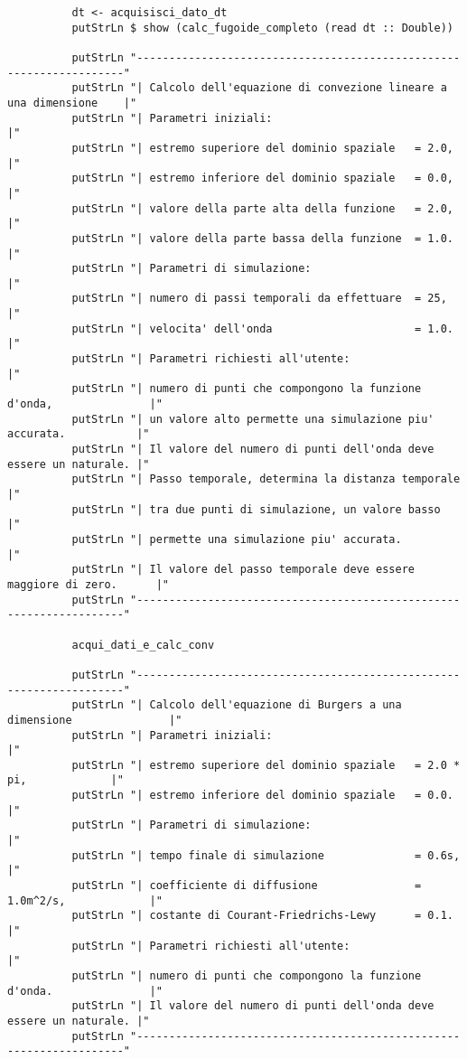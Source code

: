 \begin{verbatim}
          dt <- acquisisci_dato_dt
          putStrLn $ show (calc_fugoide_completo (read dt :: Double))

          putStrLn "--------------------------------------------------------------------"
          putStrLn "| Calcolo dell'equazione di convezione lineare a una dimensione    |"
          putStrLn "| Parametri iniziali:                                              |"
          putStrLn "| estremo superiore del dominio spaziale   = 2.0,                  |"
          putStrLn "| estremo inferiore del dominio spaziale   = 0.0,                  |" 
          putStrLn "| valore della parte alta della funzione   = 2.0,                  |" 
          putStrLn "| valore della parte bassa della funzione  = 1.0.                  |"
          putStrLn "| Parametri di simulazione:                                        |"
          putStrLn "| numero di passi temporali da effettuare  = 25,                   |" 
          putStrLn "| velocita' dell'onda                      = 1.0.                  |" 
          putStrLn "| Parametri richiesti all'utente:                                  |" 
          putStrLn "| numero di punti che compongono la funzione d'onda,               |"
          putStrLn "| un valore alto permette una simulazione piu' accurata.           |"
          putStrLn "| Il valore del numero di punti dell'onda deve essere un naturale. |"
          putStrLn "| Passo temporale, determina la distanza temporale                 |"
          putStrLn "| tra due punti di simulazione, un valore basso                    |"
          putStrLn "| permette una simulazione piu' accurata.                          |"
          putStrLn "| Il valore del passo temporale deve essere maggiore di zero.      |"
          putStrLn "--------------------------------------------------------------------"

          acqui_dati_e_calc_conv

          putStrLn "--------------------------------------------------------------------"
          putStrLn "| Calcolo dell'equazione di Burgers a una dimensione               |"
          putStrLn "| Parametri iniziali:                                              |"
          putStrLn "| estremo superiore del dominio spaziale   = 2.0 * pi,             |"
          putStrLn "| estremo inferiore del dominio spaziale   = 0.0.                  |" 
          putStrLn "| Parametri di simulazione:                                        |"
          putStrLn "| tempo finale di simulazione              = 0.6s,                 |" 
          putStrLn "| coefficiente di diffusione               = 1.0m^2/s,             |" 
          putStrLn "| costante di Courant-Friedrichs-Lewy      = 0.1.                  |" 
          putStrLn "| Parametri richiesti all'utente:                                  |" 
          putStrLn "| numero di punti che compongono la funzione d'onda.               |"
          putStrLn "| Il valore del numero di punti dell'onda deve essere un naturale. |"
          putStrLn "--------------------------------------------------------------------"


\end{verbatim}
